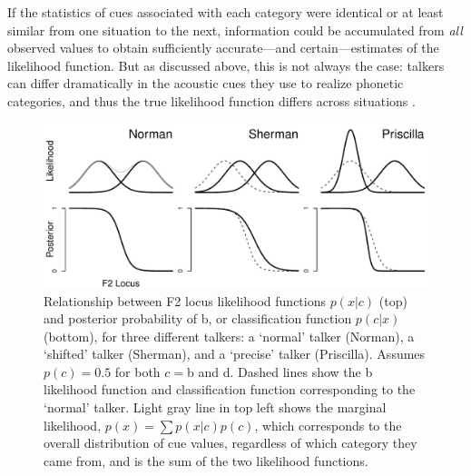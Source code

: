 If the statistics of cues associated with each category were identical or at least similar from one situation to the next, information could be accumulated from \emph{all} observed values to obtain sufficiently accurate---and certain---estimates of the likelihood function.
But as discussed above, this is not always the case: talkers can differ dramatically in the acoustic cues they use to realize phonetic categories, and thus the true likelihood function differs across situations \autocite{Allen2003,Labov1972,Hillenbrand1995,McMurray2011a,Pierrehumbert2003}.

\begin{figure}[t]
  \centering
  \includegraphics[width=\textwidth]{figs/dist-id-shift-var-schematic.pdf}
  \caption{Relationship between F2 locus likelihood functions $p(x | c)$ (top) and posterior probability of \ph b, or classification function $p(c | x)$ (bottom), for three different talkers: a `normal' talker (Norman), a `shifted' talker (Sherman), and a `precise' talker (Priscilla).  Assumes $p(c)=0.5$ for both $c=$\ph b and \ph d.  Dashed lines show the \ph b likelihood function and classification function corresponding to the `normal' talker.  Light gray line in top left shows the marginal likelihood, $p(x) = \sum p(x | c) p(c)$, which corresponds to the overall distribution of cue values, regardless of which category they came from, and is the sum of the two likelihood functions.  }
  \label{fig:dist-id-schematic}
\end{figure}

